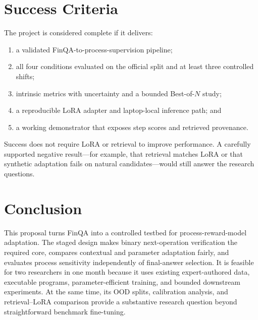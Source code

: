 \documentclass[10pt,twocolumn]{article}
\begin{document}
\section{Success Criteria}
The project is considered complete if it delivers:
\begin{enumerate}
  \item a validated FinQA-to-process-supervision pipeline;
  \item all four conditions evaluated on the official split and at least three controlled shifts;
  \item intrinsic metrics with uncertainty and a bounded Best-of-$N$ study;
  \item a reproducible LoRA adapter and laptop-local inference path; and
  \item a working demonstrator that exposes step scores and retrieved provenance.
\end{enumerate}
Success does not require LoRA or retrieval to improve performance. A carefully supported negative result---for example, that retrieval matches LoRA or that synthetic adaptation fails on natural candidates---would still answer the research questions.

\section{Conclusion}
This proposal turns FinQA into a controlled testbed for process-reward-model adaptation. The staged design makes binary next-operation verification the required core, compares contextual and parameter adaptation fairly, and evaluates process sensitivity independently of final-answer selection. It is feasible for two researchers in one month because it uses existing expert-authored data, executable programs, parameter-efficient training, and bounded downstream experiments. At the same time, its OOD splits, calibration analysis, and retrieval--LoRA comparison provide a substantive research question beyond straightforward benchmark fine-tuning.



\end{document}
